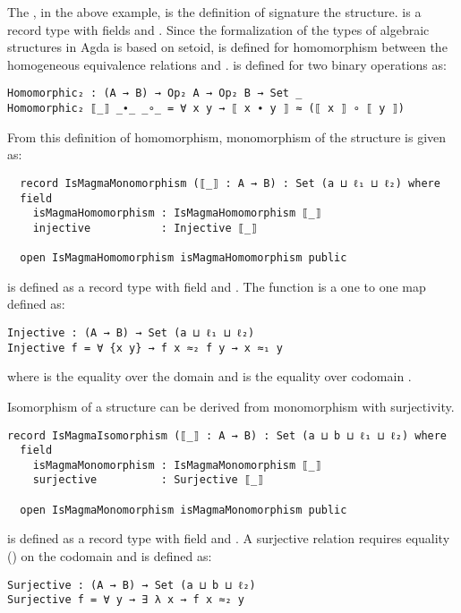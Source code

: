 The , in the above example,  is the
definition of signature the structure.  is a record
type with fields  and . Since the
formalization of the types of algebraic structures in Agda is based on setoid,
 is defined for homomorphism between the homogeneous
equivalence relations  and .  is
defined for two binary operations as:
\begin{verbatim}
Homomorphic₂ : (A → B) → Op₂ A → Op₂ B → Set _
Homomorphic₂ ⟦_⟧ _∙_ _∘_ = ∀ x y → ⟦ x ∙ y ⟧ ≈ (⟦ x ⟧ ∘ ⟦ y ⟧)
\end{verbatim}

From this definition of homomorphism, monomorphism of the structure is given as:

\begin{verbatim}
  record IsMagmaMonomorphism (⟦_⟧ : A → B) : Set (a ⊔ ℓ₁ ⊔ ℓ₂) where
  field
    isMagmaHomomorphism : IsMagmaHomomorphism ⟦_⟧
    injective           : Injective ⟦_⟧

  open IsMagmaHomomorphism isMagmaHomomorphism public
\end{verbatim}
 is defined as a record type with field
 and . The 
function is a one to one map defined as:
\begin{verbatim}
Injective : (A → B) → Set (a ⊔ ℓ₁ ⊔ ℓ₂)
Injective f = ∀ {x y} → f x ≈₂ f y → x ≈₁ y
\end{verbatim}
where  is the equality over the domain  and 
is the equality over codomain .

Isomorphism of a structure can be derived from monomorphism with surjectivity.
\begin{verbatim}
record IsMagmaIsomorphism (⟦_⟧ : A → B) : Set (a ⊔ b ⊔ ℓ₁ ⊔ ℓ₂) where
  field
    isMagmaMonomorphism : IsMagmaMonomorphism ⟦_⟧
    surjective          : Surjective ⟦_⟧

  open IsMagmaMonomorphism isMagmaMonomorphism public
\end{verbatim} 
 is defined as a record type with field
 and . A surjective relation
requires equality () on the codomain  and is defined as:
\begin{verbatim}
Surjective : (A → B) → Set (a ⊔ b ⊔ ℓ₂)
Surjective f = ∀ y → ∃ λ x → f x ≈₂ y
\end{verbatim}

